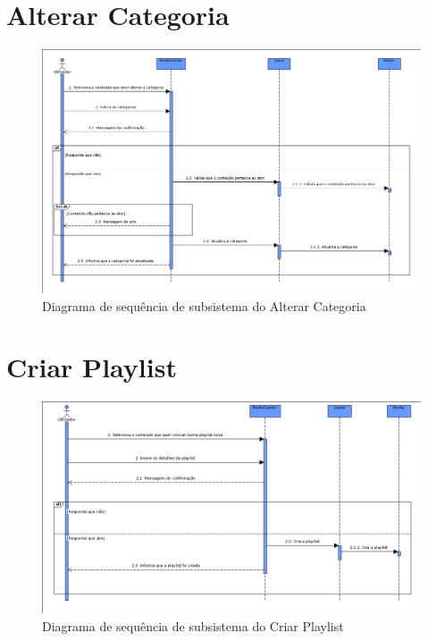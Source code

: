 \documentclass[a4paper]{report}
\begin{document}
\section{Alterar Categoria}
\begin{figure}[H]
	\centering 
    \includegraphics[width=\textwidth]{images/altcategoriaSub.png}  
    \caption{Diagrama de sequência de subsistema do Alterar Categoria}
\end{figure}

\section{Criar Playlist}
\begin{figure}[H]
	\centering 
    \includegraphics[width=\textwidth]{images/criarplaylistSub.png}  
    \caption{Diagrama de sequência de subsistema do Criar Playlist}
\end{figure}
\end{document}
